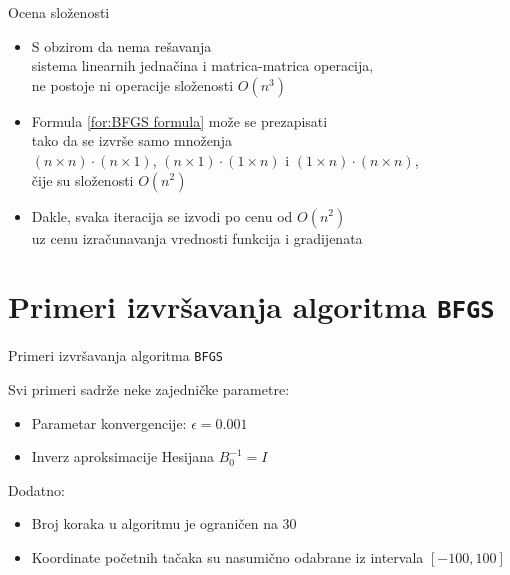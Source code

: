\documentclass[serbian]{beamer}
\begin{document}
\begin{frame}{Ocena slo\v zenosti}

\begin{itemize}
	\item S obzirom da nema re\v savanja \\
	sistema linearnih jedna\v cina i matrica-matrica operacija, \\
	ne postoje ni operacije slo\v zenosti $O(n^3)$
	
	\item Formula \ref{for:BFGS formula} mo\v ze se prezapisati \\
	tako da se izvr\v se samo mno\v zenja \\
	$(n \times n) \cdot (n \times 1)$, $(n \times 1) \cdot (1 \times n)$ i $(1 \times n) \cdot (n \times n)$, \\
	\v cije su slo\v zenosti $O(n^2)$
	
	\item Dakle, svaka iteracija se izvodi po cenu od $O(n^2)$ \\
	uz cenu izra\v cunavanja vrednosti funkcija i gradijenata
\end{itemize}

\end{frame}

\section{Primeri izvr\v savanja algoritma \texttt{BFGS}}

\begin{frame}{Primeri izvr\v savanja algoritma \texttt{BFGS}}

Svi primeri sadr\v ze neke zajedni\v cke parametre:
\begin{itemize}
	\item Parametar konvergencije: $\epsilon = 0.001$
	\item Inverz aproksimacije Hesijana $B_0^{-1} = I$
\end{itemize}

Dodatno:
\begin{itemize}
	\item Broj koraka u algoritmu je ograni\v cen na $30$
	\item Koordinate po\v cetnih ta\v caka su nasumi\v cno odabrane iz intervala $[-100, 100]$
\end{itemize}

\end{frame}
\end{document}
